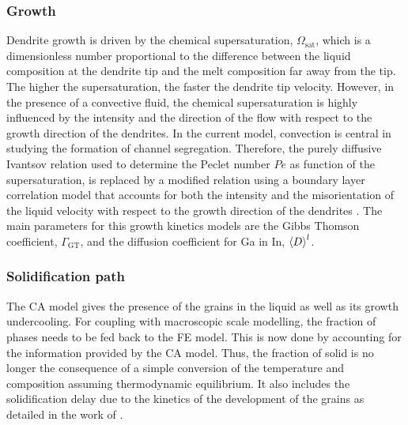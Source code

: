 \subsubsection{Growth}
Dendrite growth is driven by the chemical supersaturation, $\Omega_\text{sat}$, which is a 
dimensionless number proportional to the difference between the liquid composition at the dendrite 
tip and the melt composition far away from the tip. The higher the supersaturation, the faster the 
dendrite tip velocity. However, in the presence of a convective fluid, the chemical supersaturation 
is highly influenced by the intensity and the direction of the flow with respect to the growth direction 
of the dendrites. In the current model, convection is central in studying the formation of channel segregation. Therefore, 
the purely diffusive Ivantsov relation used to determine the Peclet number $Pe$ as function of the supersaturation, 
is replaced by a modified relation using a boundary layer correlation model that accounts for both the intensity 
and the misorientation of the liquid velocity with respect to the growth direction of the dendrites \citep{gandin_boundary_2003}. 
The main parameters for this growth kinetics models are the Gibbs Thomson coefficient, $\Gamma_{\text{GT}}$, and the diffusion 
coefficient for Ga in In, $\left \langle D \right \rangle^l$.

\subsubsection{Solidification path}
The CA model gives the presence of the grains in the liquid as well as its growth undercooling. 
For coupling with macroscopic scale modelling, the fraction of phases needs to be fed back to the 
FE model. This is now done by accounting for the information provided by the CA model. Thus, the 
fraction of solid is no longer the consequence of a simple conversion of the temperature and 
composition assuming thermodynamic equilibrium. It also includes the solidification delay due to 
the kinetics of the development of the grains as detailed in the work of \citet{carozzani_direct_2013}.

